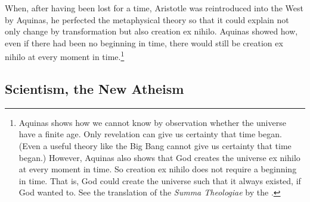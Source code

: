 \documentclass[twocolumn]{article}
\begin{document}
When, after having been lost for a time, Aristotle was reintroduced into the
West by Aquinas, he perfected the metaphysical theory so that it could explain
not only change by transformation but also creation ex nihilo.  Aquinas showed
how, even if there had been no beginning in time, there would still be creation
ex nihilo at every moment in time.\footnote{%
   Aquinas shows how we cannot know by observation whether the universe have a
   finite age.  Only revelation can give us certainty that time began.  (Even a
   useful theory like the Big Bang cannot give us certainty that time began.)
   However, Aquinas also shows that God creates the universe ex nihilo at every
   moment in time.  So creation ex nihilo does not require a beginning in time.
   That is, God could create the universe such that it always existed, if God
   wanted to.  See the translation of the {\it Summa Theologiae} by the
   \citet[I, Q45, A1, and I, Q46, A1]{e1920}.
}

\subsection{Scientism, the New Atheism}
\end{document}
